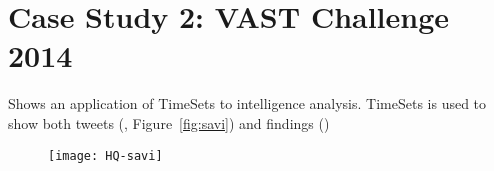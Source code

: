 \section{Case Study 2: VAST Challenge 2014}
Shows an application of TimeSets to intelligence analysis. TimeSets is used to show both tweets (, Figure~\ref{fig:savi}) and findings ()


\begin{figure}[!htb]
	\centering
	\texttt{[image: HQ-savi]}
	\caption{}
	\label{fig:ts-savi}
\end{figure}
